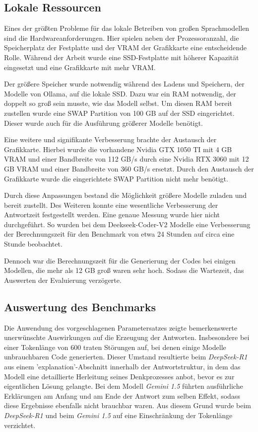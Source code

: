 \subsection{Lokale Ressourcen}
Eines der größten Probleme für das lokale Betreiben von großen Sprachmodellen sind die Hardwareanforderungen. Hier spielen neben der Prozessoranzahl, die Speicherplatz der Festplatte und der VRAM der Grafikkarte eine entscheidende Rolle. Während der Arbeit wurde eine SSD-Festplatte mit höherer Kapazität eingesetzt und eine Grafikkarte mit mehr VRAM.\vspace{0.2cm}

Der größere Speicher wurde notwendig während des Ladens und Speichern, der Modelle von Ollama, auf die lokale SSD. Dazu war ein RAM notwendig, der doppelt so groß sein musste, wie das Modell selbst. Um diesen RAM bereit zustellen wurde eine SWAP Partition von 100 GB auf der SSD eingerichtet. Dieser wurde auch für die Ausführung größerer Modelle benötigt.\vspace{0.2cm}

Eine weitere und signifikante Verbesserung brachte der Austausch der Grafikkarte. Hierbei wurde die vorhandene Nvidia GTX 1050 TI mit 4 GB \acrfull{VRAM} und einer Bandbreite von 112 GB/s durch eine Nvidia RTX 3060 mit 12 GB VRAM und einer Bandbreite von 360 GB/s ersetzt. Durch den Austausch der Grafikkarte wurde die eingerichtete SWAP Partition nicht mehr benötigt.

Durch diese Anpassungen bestand die Möglichkeit größere Modelle zuladen und bereit zustellt. Des Weiteren konnte eine wesentliche Verbesserung der Antwortzeit festgestellt werden. Eine genaue Messung wurde hier nicht durchgeführt. So wurden bei dem Deekseek-Coder-V2 Modelle eine Verbesserung der Berechnungszeit für den Benchmark von etwa 24 Stunden auf circa eine Stunde beobachtet.\vspace{0.2cm}

Dennoch war die Berechnungszeit für die Generierung der Codes bei einigen Modellen, die mehr als 12 GB groß waren sehr hoch. Sodass die Wartezeit, das Auswerten der Evaluierung verzögerte.


\subsection{Auswertung des Benchmarks}
Die Anwendung des vorgeschlagenen Parametersatzes zeigte bemerkenswerte unerwünschte Auswirkungen auf die Erzeugung der Antworten. Insbesondere bei einer Tokenlänge von 600 traten Störungen auf, bei denen einige Modelle unbrauchbaren Code generierten. Dieser Umstand resultierte beim \textit{DeepSeek-R1} aus einem 'explanation'-Abschnitt innerhalb der Antwortstruktur, in dem das Modell eine detaillierte Herleitung seines Denkprozesses anbot, bevor es zur eigentlichen Lösung gelangte. Bei dem Modell \textit{Gemini 1.5} führten ausführliche Erklärungen am Anfang und am Ende der Antwort zum selben Effekt, sodass diese Ergebnisse ebenfalls nicht brauchbar waren. Aus diesem Grund wurde beim \textit{DeepSeek-R1} und beim \textit{Gemini 1.5} auf eine Einschränkung der Tokenlänge verzichtet.\vspace{0.2cm}

